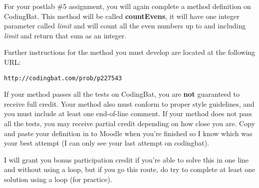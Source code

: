 For your postlab \#5 assignment, you will again complete a method definition on CodingBat. This method will be called \textbf{countEvens}, it will have one integer parameter called \textit{limit} and will count all the even numbers up to and including \textit{limit} and return that sum as an integer. 

Further instructions for the method you must develop are located at the following URL:

\begin{verbatim}
http://codingbat.com/prob/p227543
\end{verbatim}

If your method passes all the tests on CodingBat, you are \textbf{not} guaranteed to receive full credit. Your method also must conform to proper style guidelines, and you must include at least one end-of-line comment. If your method does not pass all the tests, you may receive partial credit depending on how close you are. Copy and paste your definition in to Moodle when you're finished so I know which was your best attempt (I can only see your last attempt on codingbat). 

I will grant you bonus participation credit if you're able to solve this in one line and without using a loop, but if you go this route, do try to complete at least one solution using a loop (for practice).
